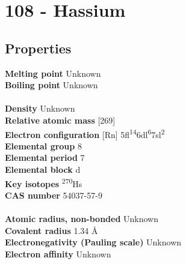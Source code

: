 \section{108 - Hassium}
\label{sec:elem-hassium}
\subsection{Properties}
\textbf{Melting point} Unknown\\
\textbf{Boiling point} Unknown\\
\\
\textbf{Density} Unknown\\
\textbf{Relative atomic mass} [269]\\
\textbf{Electron configuration} [Rn] 5fl\textsuperscript{14}6dl\textsuperscript{6}7sl\textsuperscript{2}\\
\textbf{Elemental group} 8\\
\textbf{Elemental period} 7\\
\textbf{Elemental block} d\\
\textbf{Key isotopes} \textsuperscript{270}Hs\\
\textbf{CAS number} 54037-57-9\\
\\
\textbf{Atomic radius, non-bonded} Unknown\\
\textbf{Covalent radius} 1.34 Å\\
\textbf{Electronegativity (Pauling scale)} Unknown\\
\textbf{Electron affinity} Unknown\\
